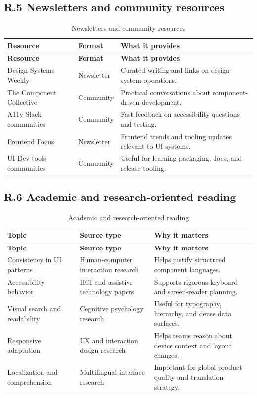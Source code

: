 \subsection*{R.5 Newsletters and community resources}
\begin{longtable}{@{}p{}p{}p{}@{}}
\caption{Newsletters and community resources}\label{tab:bibliography-newsletters}\\
\toprule
\textbf{Resource} & \textbf{Format} & \textbf{What it provides} \\
\midrule
\endfirsthead
\toprule
\textbf{Resource} & \textbf{Format} & \textbf{What it provides} \\
\midrule
\endhead
\bottomrule
\endfoot
Design Systems Weekly & Newsletter & Curated writing and links on design-system operations. \\
The Component Collective & Community & Practical conversations about component-driven development. \\
A11y Slack communities & Community & Fast feedback on accessibility questions and testing. \\
Frontend Focus & Newsletter & Frontend trends and tooling updates relevant to UI systems. \\
UI Dev tools communities & Community & Useful for learning packaging, docs, and release tooling. \\
\end{longtable}

\subsection*{R.6 Academic and research-oriented reading}
\begin{longtable}{@{}p{}p{}p{}@{}}
\caption{Academic and research-oriented reading}\label{tab:bibliography-academic}\\
\toprule
\textbf{Topic} & \textbf{Source type} & \textbf{Why it matters} \\
\midrule
\endfirsthead
\toprule
\textbf{Topic} & \textbf{Source type} & \textbf{Why it matters} \\
\midrule
\endhead
\bottomrule
\endfoot
Consistency in UI patterns & Human-computer interaction research & Helps justify structured component languages. \\
Accessibility behavior & HCI and assistive technology papers & Supports rigorous keyboard and screen-reader planning. \\
Visual search and readability & Cognitive psychology research & Useful for typography, hierarchy, and dense data surfaces. \\
Responsive adaptation & UX and interaction design research & Helps teams reason about device context and layout changes. \\
Localization and comprehension & Multilingual interface research & Important for global product quality and translation strategy. \\
\end{longtable}


